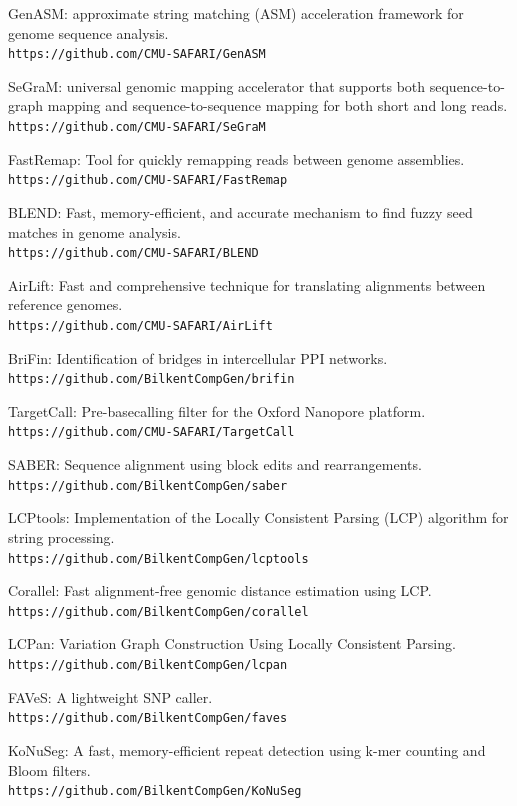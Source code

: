 \begin{list2}
  \item
GenASM: approximate string matching (ASM) acceleration framework for genome sequence analysis.\\
  {\tt https://github.com/CMU-SAFARI/GenASM}
  
  \item
  SeGraM: universal genomic mapping accelerator that supports both sequence-to-graph mapping and sequence-to-sequence mapping for both short and long reads.\\
{\tt https://github.com/CMU-SAFARI/SeGraM}
  \item
FastRemap: Tool for quickly remapping reads between genome assemblies.\\
{\tt https://github.com/CMU-SAFARI/FastRemap}
  \item
BLEND: Fast, memory-efficient, and accurate mechanism to find fuzzy seed matches in genome analysis.\\
{\tt https://github.com/CMU-SAFARI/BLEND}

  \item
AirLift: Fast and comprehensive technique for translating alignments between reference genomes.\\
{\tt https://github.com/CMU-SAFARI/AirLift}
\item 
BriFin: Identification of bridges in intercellular PPI networks.\\
{\tt https://github.com/BilkentCompGen/brifin}
\item 
TargetCall: Pre-basecalling filter for the Oxford Nanopore platform.\\
{\tt https://github.com/CMU-SAFARI/TargetCall}
\item 
SABER: Sequence alignment using block edits and rearrangements.\\
{\tt https://github.com/BilkentCompGen/saber}
\item
LCPtools: Implementation of the Locally Consistent Parsing (LCP) algorithm for string processing. \\
{\tt https://github.com/BilkentCompGen/lcptools}
\item
Corallel: Fast alignment-free genomic distance estimation using LCP.\\
{\tt https://github.com/BilkentCompGen/corallel}
\item 
LCPan: Variation Graph Construction Using Locally Consistent Parsing.\\
{\tt https://github.com/BilkentCompGen/lcpan}
\item 
FAVeS: A lightweight SNP caller.\\
{\tt https://github.com/BilkentCompGen/faves}
\item 
KoNuSeg: A fast, memory-efficient repeat detection using k-mer counting and Bloom filters.\\
{\tt https://github.com/BilkentCompGen/KoNuSeg}
\end{list2}

